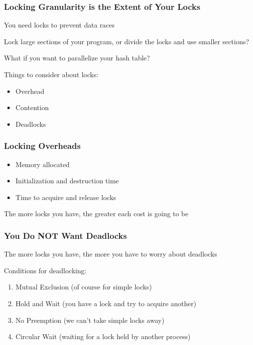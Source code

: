   \begin{frame}
    \frametitle{Locking Granularity is the Extent of Your Locks}

    You need locks to prevent data races

    \vspace{2em}

    Lock large sections of your program, or divide the locks and
    use smaller sections?

    \hspace{2em} What if you want to parallelize your hash table?

    \vspace{2em}
    
    Things to consider about locks:

    \begin{itemize}
     \item Overhead
      \item Contention
      \item Deadlocks
    \end{itemize}
  \end{frame}

  \begin{frame}
    \frametitle{Locking Overheads}

    \begin{itemize}
      \item Memory allocated
      \item Initialization and destruction time
      \item Time to acquire and release locks
    \end{itemize}

    \vspace{2em}

    The more locks you have, the greater each cost is going to be
  \end{frame}

  \begin{frame}
    \frametitle{You Do NOT Want Deadlocks}

    The more locks you have, the more you have to worry about deadlocks

    \vspace{2em}

    Conditions for deadlocking:

    \begin{enumerate}
      \item Mutual Exclusion (of course for simple locks)
      \item Hold and Wait (you have a lock and try to acquire another)
      \item No Preemption (we can't take simple locks away)
      \item Circular Wait (waiting for a lock held by another process)
    \end{enumerate}
  \end{frame}


